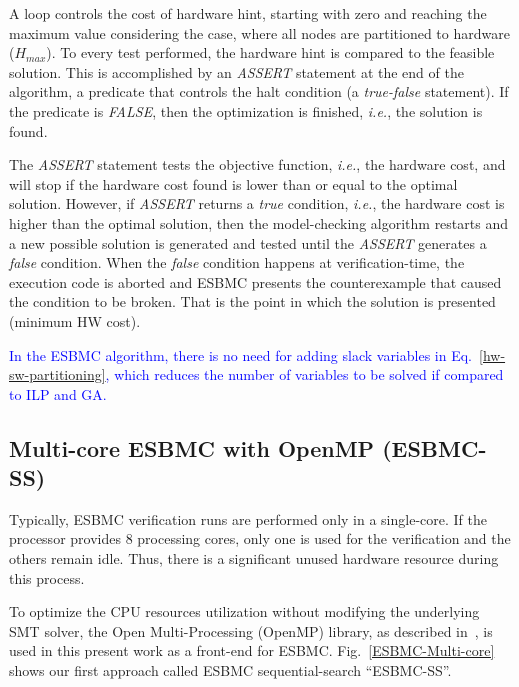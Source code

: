\documentclass{doublecol-new}
\theoremstyle{TH}{
\newtheorem{lemma}{Lemma}
\newtheorem{theorem}[lemma]{Theorem}
\newtheorem{corrolary}[lemma]{Corrolary}
\newtheorem{conjecture}[lemma]{Conjecture}
\newtheorem{proposition}[lemma]{Proposition}
\newtheorem{claim}[lemma]{Claim}
\newtheorem{stheorem}[lemma]{Wrong Theorem}
\newtheorem{algorithm}{Algorithm}
}
\theoremstyle{THrm}{
\newtheorem{definition}{Definition}[section]
\newtheorem{question}{Question}[section]
\newtheorem{remark}{Remark}
\newtheorem{scheme}{Scheme}
}
\theoremstyle{THhit}{
\newtheorem{case}{Case}[section]
}
\begin{document}
A loop controls the cost of hardware hint, starting with zero and reaching the maximum value considering the case, where all nodes are partitioned to hardware ($H_{max}$). To every test performed, the hardware hint is compared to the feasible solution. This is accomplished by an \textit{ASSERT} statement at the end of the algorithm, a predicate that controls the halt condition (a \textit{true-false} statement). If the predicate is \textit{FALSE}, then the optimization is finished, {\it i.e.}, the solution is found. 

The \textit{ASSERT} statement tests the objective function, {\it i.e.}, the hardware cost, and will stop if the hardware cost found is lower than or equal to the optimal solution. However, if \textit{ASSERT} returns a \textit{true} condition, {\it i.e.}, the hardware cost is higher than the optimal solution, then the model-checking algorithm restarts and a new possible solution is generated and tested until the \textit{ASSERT} generates a \textit{false} condition. When the \textit{false} condition happens at verification-time, the execution code is aborted and ESBMC presents the counterexample that caused the condition to be broken. That is the point in which the solution is presented (minimum HW cost).

\textcolor{blue}{In the ESBMC algorithm, there is no need for adding slack variables in Eq.~\eqref{hw-sw-partitioning}, which reduces the number of variables to be solved if compared to ILP and GA.}

\subsection{Multi-core ESBMC with OpenMP (ESBMC-SS)}
\label{Multi-core-ESBMC-with-OpenMP}

Typically, ESBMC verification runs are performed only in a single-core. If the processor provides $8$ processing cores, only one is used for the verification and the others remain idle. Thus, there is a significant unused hardware resource during this process. 

To optimize the CPU resources utilization without modifying the underlying SMT solver, the Open Multi-Processing (OpenMP) library, as described in~\cite{Dagum1998}, is used in this present work as a front-end for ESBMC. Fig.~\ref{ESBMC-Multi-core} shows our first approach called ESBMC sequential-search ``ESBMC-SS''.
\end{document}
